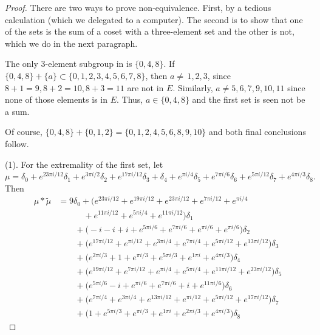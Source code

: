 \begin{proof}
There are two ways to prove non-equivalence. First, by  a tedious calculation (which we delegated to a computer). The second is to show that one of the sets is the sum
of a coset with a three-element set and the other is not, which we do in the next paragraph.


The only 3-element subgroup in  is $\{0,4,8\}$. If $\{0,4,8\}+\{a\} 
\subset\{0,1,2,3,4,5,6,7,8\}$, then $a\ne\, 1,2,3$,
 since $8+1=9,8+2=10, 8+3=11$ are 
  not in $E.$  Similarly,
   $a\ne 5,6,7,9,10,11$
 since none of those elements is in $E$. Thus, $a\in \{0,4,8\}$ and the first set is seen not be a sum.
 
 Of course, $\{0,4,8\}+\{0,1,2\}=\{0,1,2,4,5,6,8,9,10\}$ and both final conclusions follow.

(1). For the extremality of the first set, let $\mu =
 \delta_{0}  +   e^{ 23\pi i  / 12}\delta_{1}  +   e^{ 3\pi i  / 2}\delta_{2}  +   e^{ 17\pi i  / 12}\delta_{3}  +  \delta_{4}  +   e^{\pi i / 4}\delta_{5}  +   e^{ 7\pi i  / 6}\delta_{6}  +   e^{ 5\pi i  / 12}\delta_{7}  +   e^{ 4\pi i  / 3}\delta_{8}
.$
  Then
\begin{align*}\mu*\tilde\mu &= 9\delta_0+ \big( e^{ 23 \pi i / 12}+ e^{ 19 \pi i / 12}+ e^{ 23 \pi i / 12}+ e^{ 7 \pi i / 12}+ e^{\pi i / 4}
\\&\quad\qquad+ e^{ 11 \pi i / 12}+ e^{ 5 \pi i / 4}+ e^{ 11 \pi i / 12}\big)\delta_{1} 
\\&\qquad  +  \big( -i - i+  i + e^{ 5 \pi i / 6}+ e^{ 7 \pi i / 6}+ e^{\pi i / 6}+ e^{\pi i / 6}\big)\delta_{2} 
\\&\qquad  +  \big( e^{ 17 \pi i / 12}+ e^{\pi i / 12}+ e^{ 3 \pi i / 4}+ e^{ 7 \pi i / 4}+ e^{ 5 \pi i / 12}+ e^{ 13 \pi i / 12}\big)\delta_{3}
 \\&\qquad  +  \big( e^{ 2 \pi i / 3}+ 1+ e^{\pi i / 3}+ e^{ 5 \pi i / 3}+ e^{ 1 \pi i}+ e^{ 4 \pi i / 3}\big)\delta_{4} 
\\&\qquad  +  \big( e^{ 19 \pi i / 12}+ e^{ 7 \pi i / 12}+ e^{\pi i / 4}+ e^{ 5 \pi i / 4}+ e^{ 11 \pi i / 12}+ e^{ 23 \pi i / 12}\big)\delta_{5} 
\\&\qquad  +  \big( e^{ 5 \pi i / 6}- i+ e^{\pi i / 6}+ e^{ 7 \pi i / 6}+  i + e^{ 11 \pi i / 6}\big)\delta_{6} 
\\&\qquad  +  \big( e^{ 7 \pi i / 4}+ e^{ 3 \pi i / 4}+ e^{ 13 \pi i / 12}+ e^{\pi i / 12}+ e^{ 5 \pi i / 12}+ e^{ 17 \pi i / 12}\big)\delta_{7} 
\\&\qquad  +  \big( 1+ e^{ 5 \pi i / 3}+ e^{\pi i / 3}+ e^{ 1 \pi i}+ e^{ 2 \pi i / 3}+ e^{ 4 \pi i / 3}\big)\delta_{8} 

\end{align*}
\end{proof}
